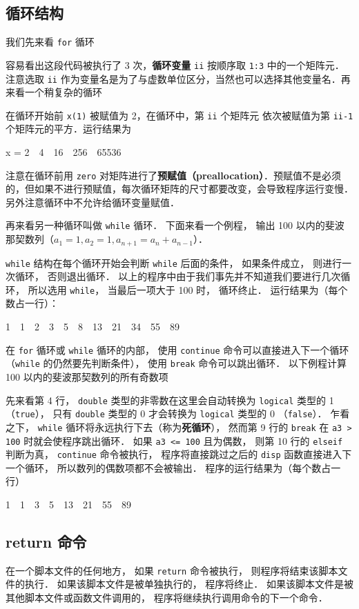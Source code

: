 \subsection{循环结构}
我们先来看 \texttt{for} 循环

容易看出这段代码被执行了 3 次，\textbf{循环变量} \texttt{ii} 按顺序取 \texttt{1:3} 中的一个矩阵元．注意选取 \texttt{ii} 作为变量名是为了与虚数单位区分，当然也可以选择其他变量名．再来看一个稍复杂的循环

在循环开始前 \texttt{x(1)} 被赋值为 2，在循环中，第 \texttt{ii} 个矩阵元 依次被赋值为第 \texttt{ii-1} 个矩阵元的平方．运行结果为
\begin{Command}
x = 2\ \ 4\ \ 16\ \ 256\ \ 65536
\end{Command}
注意在循环前用 \texttt{zero} 对矩阵进行了\textbf{预赋值（preallocation）}．预赋值不是必须的，但如果不进行预赋值，每次循环矩阵的尺寸都要改变，会导致程序运行变慢．另外注意循环中不允许给循环变量赋值．

再来看另一种循环叫做 \texttt{while} 循环． 下面来看一个例程， 输出 100 以内的斐波那契数列（$a_1 = 1, a_2 = 1, a_{n+1} = a_{n} + a_{n-1}$）．

\texttt{while} 结构在每个循环开始会判断 \texttt{while} 后面的条件， 如果条件成立， 则进行一次循环， 否则退出循环． 以上的程序中由于我们事先并不知道我们要进行几次循环， 所以选用 \texttt{while}， 当最后一项大于 100 时， 循环终止． 运行结果为（每个数占一行）：
\begin{Command}
1\ \ 1\ \ 2\ \ 3\ \ 5\ \ 8\ \ 13\ \ 21\ \ 34\ \ 55\ \ 89
\end{Command}

在 \texttt{for} 循环或 \texttt{while} 循环的内部， 使用 \texttt{continue} 命令可以直接进入下一个循环（\texttt{while} 的仍然要先判断条件）， 使用 \texttt{break} 命令可以跳出循环． 以下例程计算 100 以内的斐波那契数列的所有奇数项

先来看第 4 行， \texttt{double} 类型的非零数在这里会自动转换为 \texttt{logical} 类型的 1 （\texttt{true}）， 只有 \texttt{double} 类型的 0 才会转换为 \texttt{logical} 类型的 0 （\texttt{false}）． 乍看之下， \texttt{while} 循环将永远执行下去（称为\textbf{死循环}）， 然而第 9 行的 \texttt{break} 在 \texttt{a3 > 100} 时就会使程序跳出循环． 如果 \texttt{a3 <= 100} 且为偶数， 则第 10 行的 \texttt{elseif} 判断为真， \texttt{continue} 命令被执行， 程序将直接跳过之后的 \texttt{disp} 函数直接进入下一个循环， 所以数列的偶数项都不会被输出． 程序的运行结果为（每个数占一行）
\begin{Command}
1\ \ 1\ \ 3\ \ 5\ \ 13\ \ 21\ \ 55\ \ 89
\end{Command}

\subsection{return 命令}
在一个脚本文件的任何地方， 如果 \texttt{return} 命令被执行， 则程序将结束该脚本文件的执行． 如果该脚本文件是被单独执行的， 程序将终止． 如果该脚本文件是被其他脚本文件或函数文件调用的， 程序将继续执行调用命令的下一个命令．



